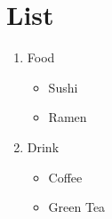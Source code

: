 \documentclass[pdflatex, a4paper, 10pt, jadriver=standard]{bxjsarticle}
\begin{document}
 
\section*{\Large List}

    
\begin{enumerate}

     \item Food
		 
\begin{itemize}

			  \item Sushi

			  \item Ramen

		
\end{itemize}
	

     \item Drink
		 
\begin{itemize}

			  \item Coffee

			  \item Green Tea

		
\end{itemize}
	

    
\end{enumerate}
    
\end{document}
